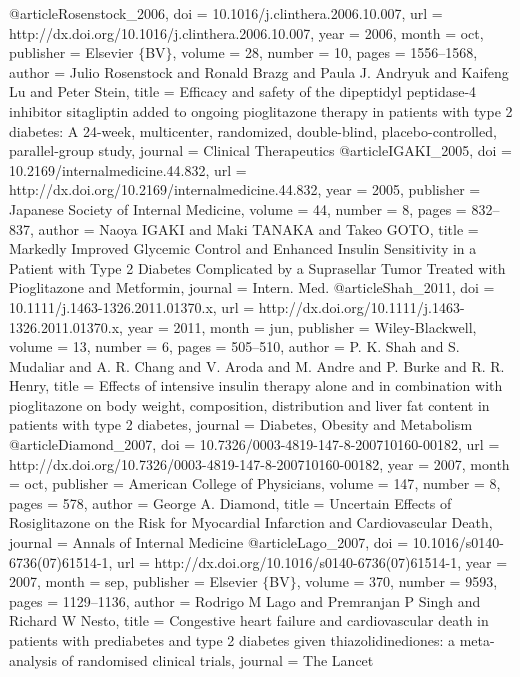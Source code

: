 @article{Rosenstock_2006,
	doi = {10.1016/j.clinthera.2006.10.007},
	url = {http://dx.doi.org/10.1016/j.clinthera.2006.10.007},
	year = 2006,
	month = {oct},
	publisher = {Elsevier $\lbrace$BV$\rbrace$},
	volume = {28},
	number = {10},
	pages = {1556--1568},
	author = {Julio Rosenstock and Ronald Brazg and Paula J. Andryuk and Kaifeng Lu and Peter Stein},
	title = {Efficacy and safety of the dipeptidyl peptidase-4 inhibitor sitagliptin added to ongoing pioglitazone therapy in patients with type 2 diabetes: A 24-week, multicenter, randomized, double-blind, placebo-controlled, parallel-group study},
	journal = {Clinical Therapeutics}
}
@article{IGAKI_2005,
	doi = {10.2169/internalmedicine.44.832},
	url = {http://dx.doi.org/10.2169/internalmedicine.44.832},
	year = 2005,
	publisher = {Japanese Society of Internal Medicine},
	volume = {44},
	number = {8},
	pages = {832--837},
	author = {Naoya IGAKI and Maki TANAKA and Takeo GOTO},
	title = {Markedly Improved Glycemic Control and Enhanced Insulin Sensitivity in a Patient with Type 2 Diabetes Complicated by a Suprasellar Tumor Treated with Pioglitazone and Metformin},
	journal = {Intern. Med.}
}
@article{Shah_2011,
	doi = {10.1111/j.1463-1326.2011.01370.x},
	url = {http://dx.doi.org/10.1111/j.1463-1326.2011.01370.x},
	year = 2011,
	month = {jun},
	publisher = {Wiley-Blackwell},
	volume = {13},
	number = {6},
	pages = {505--510},
	author = {P. K. Shah and S. Mudaliar and A. R. Chang and V. Aroda and M. Andre and P. Burke and R. R. Henry},
	title = {Effects of intensive insulin therapy alone and in combination with pioglitazone on body weight, composition, distribution and liver fat content in patients with type 2 diabetes},
	journal = {Diabetes, Obesity and Metabolism}
}
@article{Diamond_2007,
	doi = {10.7326/0003-4819-147-8-200710160-00182},
	url = {http://dx.doi.org/10.7326/0003-4819-147-8-200710160-00182},
	year = 2007,
	month = {oct},
	publisher = {American College of Physicians},
	volume = {147},
	number = {8},
	pages = {578},
	author = {George A. Diamond},
	title = {Uncertain Effects of Rosiglitazone on the Risk for Myocardial Infarction and Cardiovascular Death},
	journal = {Annals of Internal Medicine}
}
@article{Lago_2007,
	doi = {10.1016/s0140-6736(07)61514-1},
	url = {http://dx.doi.org/10.1016/s0140-6736(07)61514-1},
	year = 2007,
	month = {sep},
	publisher = {Elsevier $\lbrace$BV$\rbrace$},
	volume = {370},
	number = {9593},
	pages = {1129--1136},
	author = {Rodrigo M Lago and Premranjan P Singh and Richard W Nesto},
	title = {Congestive heart failure and cardiovascular death in patients with prediabetes and type 2 diabetes given thiazolidinediones: a meta-analysis of randomised clinical trials},
	journal = {The Lancet}
}
